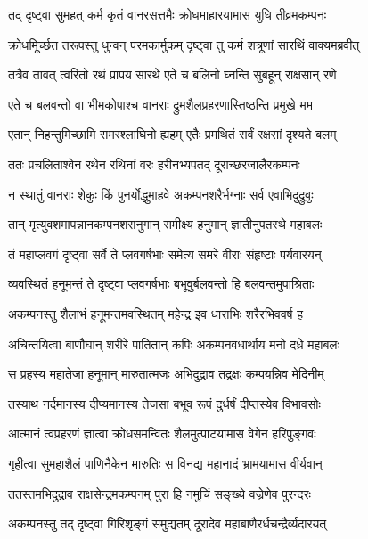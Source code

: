 
\twolineshloka
{तद् दृष्ट्वा सुमहत् कर्म कृतं वानरसत्तमैः}
{क्रोधमाहारयामास युधि तीव्रमकम्पनः} %

\twolineshloka
{क्रोधमूिर्च्छत तरूपस्तु धुन्वन् परमकार्मुकम्}
{दृष्ट्वा तु कर्म शत्रूणां सारथिं वाक्यमब्रवीत्} %

\twolineshloka
{तत्रैव तावत् त्वरितो रथं प्रापय सारथे}
{एते च बलिनो घ्नन्ति सुबहून् राक्षसान् रणे} %

\twolineshloka
{एते च बलवन्तो वा भीमकोपाश्च वानराः}
{द्रुमशैलप्रहरणास्तिष्ठन्ति प्रमुखे मम} %

\twolineshloka
{एतान् निहन्तुमिच्छामि समरश्लाघिनो ह्यहम्}
{एतैः प्रमथितं सर्वं रक्षसां दृश्यते बलम्} %

\twolineshloka
{ततः प्रचलिताश्वेन रथेन रथिनां वरः}
{हरीनभ्यपतद् दूराच्छरजालैरकम्पनः} %

\twolineshloka
{न स्थातुं वानराः शेकुः किं पुनर्योद्धुमाहवे}
{अकम्पनशरैर्भग्नाः सर्व एवाभिदुद्रुवुः} %

\twolineshloka
{तान् मृत्युवशमापन्नानकम्पनशरानुगान्}
{समीक्ष्य हनुमान् ज्ञातीनुपतस्थे महाबलः} %

\twolineshloka
{तं महाप्लवगं दृष्ट्वा सर्वे ते प्लवगर्षभाः}
{समेत्य समरे वीराः संहृष्टाः पर्यवारयन्} %

\twolineshloka
{व्यवस्थितं हनूमन्तं ते दृष्ट्वा प्लवगर्षभाः}
{बभूवुर्बलवन्तो हि बलवन्तमुपाश्रिताः} %

\twolineshloka
{अकम्पनस्तु शैलाभं हनूमन्तमवस्थितम्}
{महेन्द्र इव धाराभिः शरैरभिववर्ष ह} %

\twolineshloka
{अचिन्तयित्वा बाणौघान् शरीरे पातितान् कपिः}
{अकम्पनवधार्थाय मनो दध्रे महाबलः} %

\twolineshloka
{स प्रहस्य महातेजा हनूमान् मारुतात्मजः}
{अभिदुद्राव तद्रक्षः कम्पयन्निव मेदिनीम्} %

\twolineshloka
{तस्याथ नर्दमानस्य दीप्यमानस्य तेजसा}
{बभूव रूपं दुर्धर्षं दीप्तस्येव विभावसोः} %

\twolineshloka
{आत्मानं त्वप्रहरणं ज्ञात्वा क्रोधसमन्वितः}
{शैलमुत्पाटयामास वेगेन हरिपुङ्गवः} %

\twolineshloka
{गृहीत्वा सुमहाशैलं पाणिनैकेन मारुतिः}
{स विनद्य महानादं भ्रामयामास वीर्यवान्} %

\twolineshloka
{ततस्तमभिदुद्राव राक्षसेन्द्रमकम्पनम्}
{पुरा हि नमुचिं सङ्ख्ये वज्रेणेव पुरन्दरः} %

\twolineshloka
{अकम्पनस्तु तद् दृष्ट्वा गिरिशृङ्गं समुद्यतम्}
{दूरादेव महाबाणैरर्धचन्द्रैर्व्यदारयत्} %

